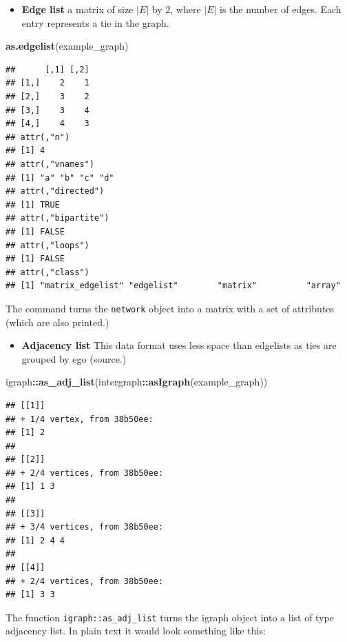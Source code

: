 \documentclass[
]{book}
\newenvironment{Shaded}{\begin{snugshade}}{\end{snugshade}}
\newcommand{\FunctionTok}[1]{\textcolor[rgb]{0.13,0.29,0.53}{\textbf{#1}}}
\newcommand{\NormalTok}[1]{#1}
\newcommand{\SpecialCharTok}[1]{\textcolor[rgb]{0.81,0.36,0.00}{\textbf{#1}}}
\providecommand{\tightlist}{%
  \setlength{\itemsep}{0pt}\setlength{\parskip}{0pt}}
\begin{document}
\begin{itemize}
\tightlist
\item
  \textbf{Edge list} a matrix of size \(|E|\) by \(2\), where \(|E|\) is the number of edges.
  Each entry represents a tie in the graph.
\end{itemize}

\begin{Shaded}
\begin{Highlighting}[]
\FunctionTok{as.edgelist}\NormalTok{(example\_graph)}
\end{Highlighting}
\end{Shaded}

\begin{verbatim}
##      [,1] [,2]
## [1,]    2    1
## [2,]    3    2
## [3,]    3    4
## [4,]    4    3
## attr(,"n")
## [1] 4
## attr(,"vnames")
## [1] "a" "b" "c" "d"
## attr(,"directed")
## [1] TRUE
## attr(,"bipartite")
## [1] FALSE
## attr(,"loops")
## [1] FALSE
## attr(,"class")
## [1] "matrix_edgelist" "edgelist"        "matrix"          "array"
\end{verbatim}

The command turns the \texttt{network} object into a matrix with a set of attributes
(which are also printed.)

\begin{itemize}
\tightlist
\item
  \textbf{Adjacency list} This data format uses less space than edgelists as ties are
  grouped by ego (source.)
\end{itemize}

\begin{Shaded}
\begin{Highlighting}[]
\NormalTok{igraph}\SpecialCharTok{::}\FunctionTok{as\_adj\_list}\NormalTok{(intergraph}\SpecialCharTok{::}\FunctionTok{asIgraph}\NormalTok{(example\_graph)) }
\end{Highlighting}
\end{Shaded}

\begin{verbatim}
## [[1]]
## + 1/4 vertex, from 38b50ee:
## [1] 2
## 
## [[2]]
## + 2/4 vertices, from 38b50ee:
## [1] 1 3
## 
## [[3]]
## + 3/4 vertices, from 38b50ee:
## [1] 2 4 4
## 
## [[4]]
## + 2/4 vertices, from 38b50ee:
## [1] 3 3
\end{verbatim}

The function \texttt{igraph::as\_adj\_list} turns the igraph object into a list of
type adjacency list. In plain text it would look something like this:
\end{document}
